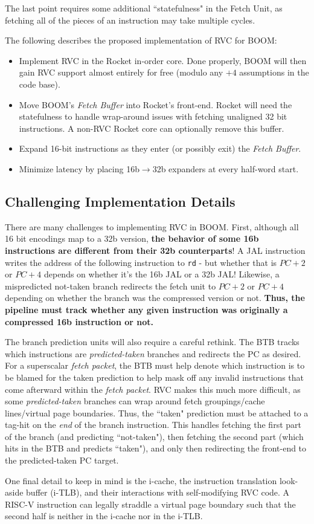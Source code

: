 The last point requires some additional ``statefulness" in the Fetch Unit, as fetching all of the pieces of an instruction may take multiple cycles. 

The following describes the proposed implementation of RVC for BOOM:

\begin{itemize}
\item Implement RVC in the Rocket in-order core.  Done properly, BOOM will then gain RVC support almost entirely for free (modulo any $+4$ assumptions in the code base).
\item Move BOOM's {\em Fetch Buffer} into Rocket's front-end. Rocket will need the statefulness to handle wrap-around issues with fetching unaligned 32 bit instructions.  A non-RVC Rocket core can optionally remove this buffer. 
\item Expand 16-bit instructions as they enter (or possibly exit) the {\em Fetch Buffer}. 
\item Minimize latency by placing 16b$\rightarrow$32b expanders at every half-word start. 
\end{itemize}

\subsection{Challenging Implementation Details}

There are many challenges to implementing RVC in BOOM. First, although all 16 bit encodings map to a 32b version, {\bf the behavior of some 16b instructions are different from their 32b counterparts}!  A JAL instruction writes the address of the following instruction to {\tt rd} - but whether that is $PC+2$ or $PC+4$ depends on whether it's the 16b JAL or a 32b JAL!  Likewise, a mispredicted not-taken branch redirects the fetch unit to $PC+2$ or $PC+4$ depending on whether the branch was the compressed version or not. {\bf Thus, the pipeline must track whether any given instruction was originally a compressed 16b instruction or not.}

The branch prediction units will also require a careful rethink. The BTB tracks which instructions are {\em predicted-taken} branches and redirects the PC as desired. For a superscalar {\em fetch packet}, the BTB must help denote which instruction is to be blamed for the taken prediction to help mask off any invalid instructions that come afterward within the {\em fetch packet}. RVC makes this much more difficult, as some {\em predicted-taken} branches can wrap around fetch groupings/cache lines/virtual page boundaries. Thus, the ``taken" prediction must be attached to a tag-hit on the {\em end} of the branch instruction.  This handles fetching the first part of the branch (and predicting ``not-taken"), then fetching the second part (which hits in the BTB and predicts ``taken"), and only then redirecting the front-end to the predicted-taken PC target. 

One final detail to keep in mind is the i-cache, the instruction translation look-aside buffer (i-TLB), and their interactions with self-modifying RVC code. A RISC-V instruction can legally straddle a virtual page boundary such that the second half is neither in the i-cache nor in the i-TLB. 
